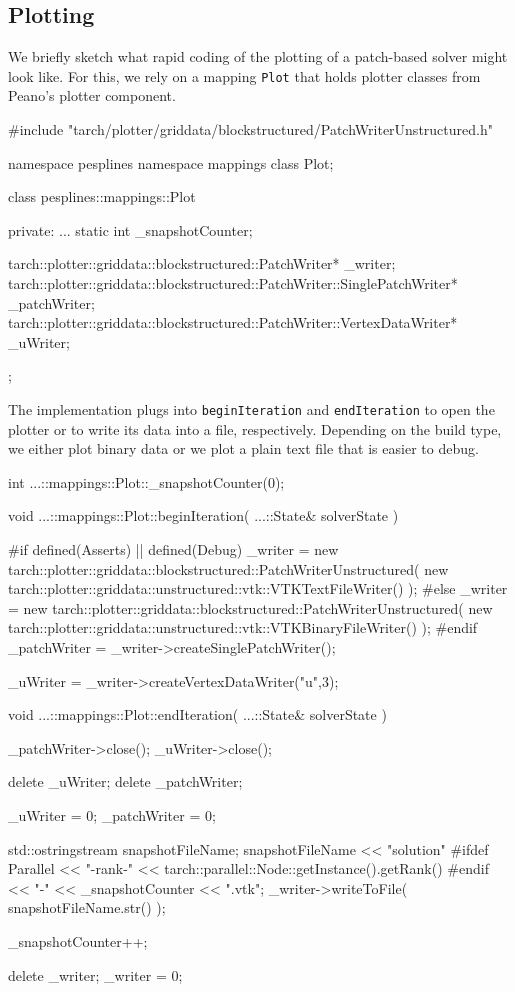 \subsection{Plotting}

We briefly sketch what rapid coding of the plotting of a patch-based solver
might look like.
For this, we rely on a mapping \texttt{Plot} that holds plotter classes from 
Peano's plotter component.


\begin{code}
#include "tarch/plotter/griddata/blockstructured/PatchWriterUnstructured.h"

namespace pesplines {
  namespace mappings {
    class Plot;
  }
}

class pesplines::mappings::Plot {
  private:
    ...
    static int                  _snapshotCounter;

    tarch::plotter::griddata::blockstructured::PatchWriter*                      _writer;
    tarch::plotter::griddata::blockstructured::PatchWriter::SinglePatchWriter*   _patchWriter;
    tarch::plotter::griddata::blockstructured::PatchWriter::VertexDataWriter*    _uWriter;
};
\end{code}

\noindent
The implementation plugs into \texttt{beginIteration} and \texttt{endIteration}
to open the plotter or to write its data into a file, respectively.
Depending on the build type, we either plot binary data or we plot a plain text
file that is easier to debug.

\begin{code}
int ...::mappings::Plot::_snapshotCounter(0);

void ...::mappings::Plot::beginIteration(
  ...::State&  solverState
) {
  #if defined(Asserts) || defined(Debug)
  _writer = new tarch::plotter::griddata::blockstructured::PatchWriterUnstructured( 
    new tarch::plotter::griddata::unstructured::vtk::VTKTextFileWriter() );
  #else
  _writer = new tarch::plotter::griddata::blockstructured::PatchWriterUnstructured( 
    new tarch::plotter::griddata::unstructured::vtk::VTKBinaryFileWriter() );
  #endif
  _patchWriter            = _writer->createSinglePatchWriter();

  _uWriter         = _writer->createVertexDataWriter("u",3);
}


void ...::mappings::Plot::endIteration(
  ...::State&  solverState
) {
  _patchWriter->close();
  _uWriter->close();

  delete _uWriter;
  delete _patchWriter;

  _uWriter = 0;
  _patchWriter = 0;

  std::ostringstream snapshotFileName;
  snapshotFileName << "solution"
                   #ifdef Parallel
                   << "-rank-" << tarch::parallel::Node::getInstance().getRank()
                   #endif
                   << "-" << _snapshotCounter
                   << ".vtk";
  _writer->writeToFile( snapshotFileName.str() );

  _snapshotCounter++;

  delete _writer;
  _writer = 0;
}
\end{code}

